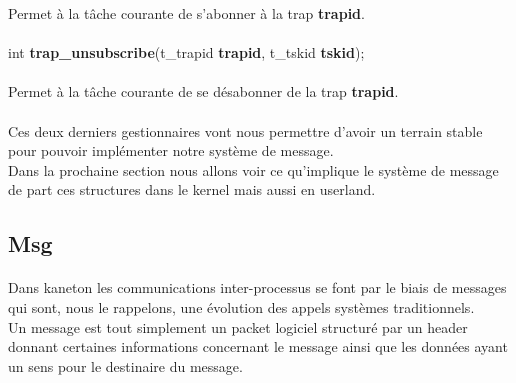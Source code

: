 \documentclass[10pt,a4wide]{article}
\begin{document}
Permet \`a la t\^ache courante de s'abonner \`a la trap \textbf{trapid}.

\paragraph{}

\hspace{1.5cm}int \textbf{trap\_unsubscribe}(t\_trapid \textbf{trapid},
                                             t\_tskid \textbf{tskid});

\paragraph{}

Permet \`a la t\^ache courante de se d\'esabonner de la trap \textbf{trapid}.

\paragraph{}

Ces deux derniers gestionnaires vont nous permettre d'avoir un terrain stable pour pouvoir impl\'ementer notre syst\`eme
de message.\\
Dans la prochaine section nous allons voir ce qu'implique le syst\`eme de message de part ces structures dans le kernel mais
aussi en userland.

\subsection{Msg}

\paragraph{}

Dans kaneton les communications inter-processus se font par le biais de messages qui sont, nous le rappelons, une \'evolution
des appels syst\`emes traditionnels.\\
Un message est tout simplement un packet logiciel structur\'e par un header donnant certaines informations concernant le
message ainsi que les donn\'ees ayant un sens pour le destinaire du message.\\

\paragraph{}
\end{document}
